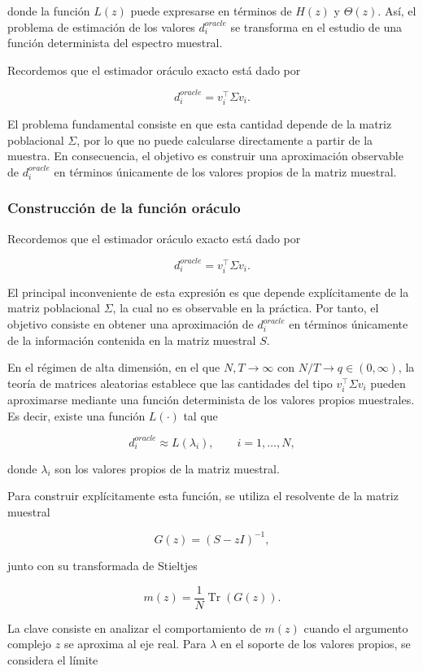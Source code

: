 \documentclass[letterpaper,12pt,oneside]{book}
\begin{document}
donde la función $L(z)$ puede expresarse en términos de $H(z)$ y $\Theta(z)$. Así, el problema de estimación de los valores $d_i^{oracle}$ se transforma en el estudio de una función determinista del espectro muestral.

Recordemos que el estimador oráculo exacto está dado por

\[
d_i^{oracle}=v_i^\top \Sigma v_i.
\]

El problema fundamental consiste en que esta cantidad depende de la matriz poblacional $\Sigma$, por lo que no puede calcularse directamente a partir de la muestra. En consecuencia, el objetivo es construir una aproximación observable de $d_i^{oracle}$ en términos únicamente de los valores propios de la matriz muestral.


\subsubsection*{Construcción de la función oráculo}

Recordemos que el estimador oráculo exacto está dado por

\[
d_i^{oracle}=v_i^\top \Sigma v_i.
\]

El principal inconveniente de esta expresión es que depende explícitamente de la matriz poblacional $\Sigma$, la cual no es observable en la práctica. Por tanto, el objetivo consiste en obtener una aproximación de $d_i^{oracle}$ en términos únicamente de la información contenida en la matriz muestral $S$.

En el régimen de alta dimensión, en el que $N,T \to \infty$ con $N/T \to q \in (0,\infty)$, la teoría de matrices aleatorias establece que las cantidades del tipo $v_i^\top \Sigma v_i$ pueden aproximarse mediante una función determinista de los valores propios muestrales. Es decir, existe una función $L(\cdot)$ tal que

\[
d_i^{oracle}\approx L(\lambda_i),
\qquad i=1,\dots,N,
\]

donde $\lambda_i$ son los valores propios de la matriz muestral.

Para construir explícitamente esta función, se utiliza el resolvente de la matriz muestral

\[
G(z)=(S-zI)^{-1},
\]

junto con su transformada de Stieltjes

\[
m(z)=\frac{1}{N}\operatorname{Tr}(G(z)).
\]

La clave consiste en analizar el comportamiento de $m(z)$ cuando el argumento complejo $z$ se aproxima al eje real. Para $\lambda$ en el soporte de los valores propios, se considera el límite
\end{document}
